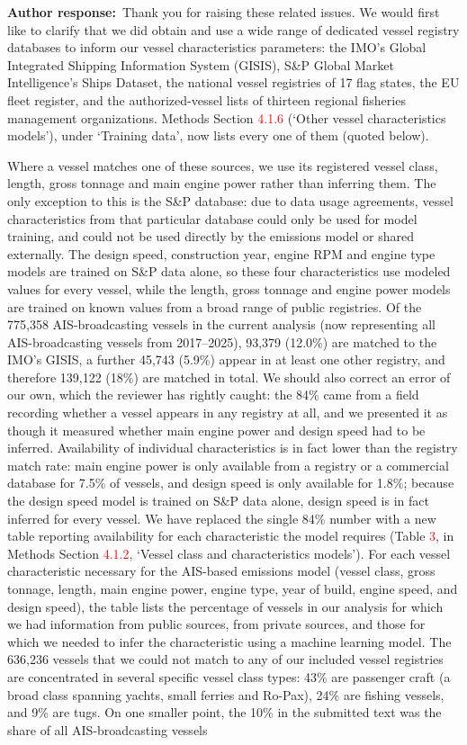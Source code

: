 \documentclass[11pt]{article}
\newcommand{\response}{\par\medskip\noindent%
  \textbf{\textcolor{respblue}{Author response:}}\ }
\begin{document}
\response Thank you for raising these related issues. We would first like to clarify that we did obtain and use a wide range of dedicated vessel registry databases to inform our vessel characteristics parameters: the IMO's Global Integrated Shipping Information System (GISIS), S\&P Global Market Intelligence's Ships Dataset, the national vessel registries of 17 flag states, the EU fleet register, and the authorized-vessel lists of thirteen regional fisheries management organizations. Methods Section \textcolor{red}{4.1.6} (`Other vessel characteristics models'), under `Training data', now lists every one of them (quoted below).

Where a vessel matches one of these sources, we use its registered vessel class, length, gross tonnage and main engine power rather than inferring them. The only exception to this is the S\&P database: due to data usage agreements, vessel characteristics from that particular database could only be used for model training, and could not be used directly by the emissions model or shared externally. The design speed, construction year, engine RPM and engine type models are trained on S\&P data alone, so these four characteristics use modeled values for every vessel, while the length, gross tonnage and engine power models are trained on known values from a broad range of public registries. Of the 775,358 AIS-broadcasting vessels in the current analysis (now representing all AIS-broadcasting vessels from 2017--2025), 93,379 (12.0\%) are matched to the IMO's GISIS, a further 45,743 (5.9\%) appear in at least one other registry, and therefore 139,122 (18\%) are matched in total. We should also correct an error of our own, which the reviewer has rightly caught: the 84\% came from a field recording whether a vessel appears in any registry at all, and we presented it as though it measured whether main engine power and design speed had to be inferred. Availability of individual characteristics is in fact lower than the registry match rate: main engine power is only available from a registry or a commercial database for 7.5\% of vessels, and design speed is only available for 1.8\%; because the design speed model is trained on S\&P data alone, design speed is in fact inferred for every vessel. We have replaced the single 84\% number with a new table reporting availability for each characteristic the model requires (Table \textcolor{red}{3}, in Methods Section \textcolor{red}{4.1.2}, `Vessel class and characteristics models'). For each vessel characteristic necessary for the AIS-based emissions model (vessel class, gross tonnage, length, main engine power, engine type, year of build, engine speed, and design speed), the table lists the percentage of vessels in our analysis for which we had information from public sources, from private sources, and those for which we needed to infer the characteristic using a machine learning model. The 636,236 vessels that we could not match to any of our included vessel registries are concentrated in several specific vessel class types: 43\% are passenger craft (a broad class spanning yachts, small ferries and Ro-Pax), 24\% are fishing vessels, and 9\% are tugs. On one smaller point, the 10\% in the submitted text was the share of all AIS-broadcasting vessels 
\end{document}
